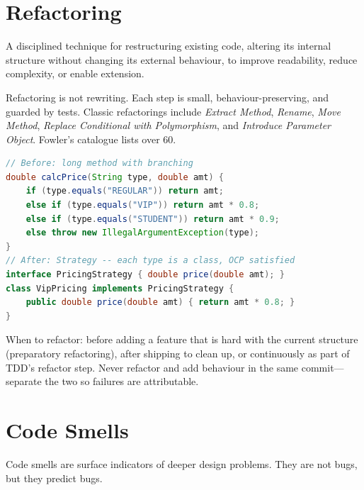 \section{Refactoring}

\begin{definition}[Refactoring]
A disciplined technique for restructuring existing code, altering its internal structure without changing its external behaviour, to improve readability, reduce complexity, or enable extension.
\end{definition}

Refactoring is not rewriting. Each step is small, behaviour-preserving, and guarded by tests. Classic refactorings include \emph{Extract Method}, \emph{Rename}, \emph{Move Method}, \emph{Replace Conditional with Polymorphism}, and \emph{Introduce Parameter Object}. Fowler's catalogue lists over 60.

\begin{lstlisting}[language=Java,caption={Refactoring: Replace Nested Conditional with Strategy (extract).}]
// Before: long method with branching
double calcPrice(String type, double amt) {
    if (type.equals("REGULAR")) return amt;
    else if (type.equals("VIP")) return amt * 0.8;
    else if (type.equals("STUDENT")) return amt * 0.9;
    else throw new IllegalArgumentException(type);
}
// After: Strategy -- each type is a class, OCP satisfied
interface PricingStrategy { double price(double amt); }
class VipPricing implements PricingStrategy {
    public double price(double amt) { return amt * 0.8; }
}
\end{lstlisting}

When to refactor: before adding a feature that is hard with the current structure (preparatory refactoring), after shipping to clean up, or continuously as part of TDD's refactor step. Never refactor and add behaviour in the same commit---separate the two so failures are attributable.

\section{Code Smells}

Code smells are surface indicators of deeper design problems. They are not bugs, but they predict bugs.

